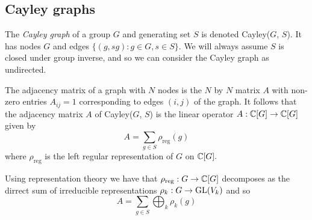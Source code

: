 \documentclass[12pt,notitlepage,longbibliography,nofootinbib,tightenlines]{revtex4}
\begin{document}
%
%
%

\subsection{Cayley graphs}

\def\rhoreg{\rho_\mathrm{reg}}

The {\it Cayley graph} of a group $G$ and
generating set $S$ is denoted Cayley($G$, $S$).
It has nodes $G$ and edges $\{(g, sg) : g \in G, s \in S\}$.
We will always assume $S$ is closed under group inverse,
and so we can consider the Cayley graph as undirected.

The adjacency matrix of a graph with $N$ nodes is the 
$N$ by $N$ matrix $A$ with non-zero entries $A_{ij}=1$ corresponding
to edges $(i, j)$ of the graph.
It follows that the adjacency matrix $A$ of Cayley($G$, $S$)
is the linear operator $A:\mathbb{C}[G]\to\mathbb{C}[G]$
given by
$$
    A = \sum_{g\in S}\rho_{\mathrm{reg}}(g)
$$
where $\rho_{\mathrm{reg}}$ is the left regular representation of
$G$ on $\mathbb{C}[G].$

Using representation theory we have that 
$\rhoreg:G\to \Complex[G]$
decomposes as the dirrect sum of irreducible
representations $\rho_k:G\to \mathrm{GL}(V_k)$
and so
$$
    A = \sum_{g\in S}\bigoplus_k \rho_k(g)
$$
\end{document}
